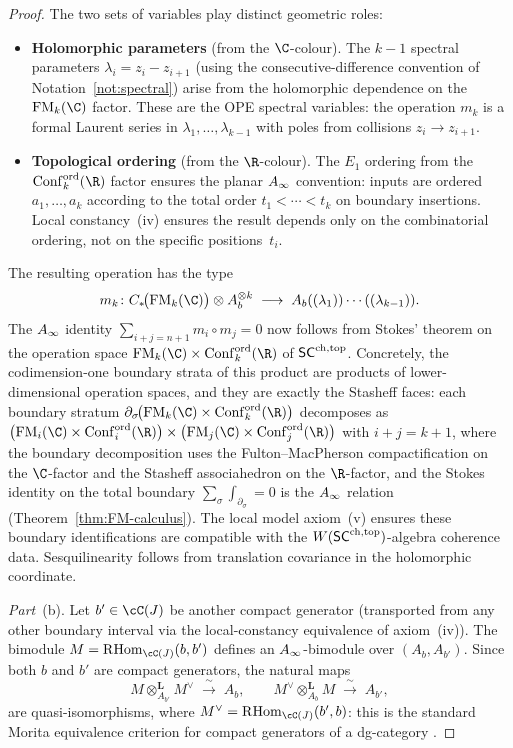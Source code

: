 \begin{proof}
The two sets of variables play distinct geometric roles:
\begin{itemize}
\item \textbf{Holomorphic parameters} (from the $\C$-colour). The
 $k-1$ spectral
 parameters $\lambda_i = z_i - z_{i+1}$ (using the consecutive-difference convention of Notation~\ref{not:spectral}) arise from the
 holomorphic dependence on the $\FM_k(\C)$ factor. These are the
 OPE spectral variables: the operation $m_k$ is a formal Laurent
 series in $\lambda_1,\ldots,\lambda_{k-1}$ with poles from
 collisions $z_i \to z_{i+1}$.
\item \textbf{Topological ordering} (from the $\R$-colour). The
 $E_1$ ordering from the
 $\Conf^{\mathrm{ord}}_k(\R)$ factor ensures the planar
 $A_\infty$ convention: inputs are ordered $a_1,\ldots,a_k$
 according to the total order $t_1 < \cdots < t_k$ on boundary
 insertions. Local constancy~(iv) ensures the result depends
 only on the combinatorial ordering, not on the specific
 positions~$t_i$.
\end{itemize}
The resulting operation has the type
\[
 m_k \colon
 C_\ast\!\bigl(\FM_k(\C)\bigr) \otimes A_b^{\otimes k}
 \;\longrightarrow\; A_b((\lambda_1))\cdots((\lambda_{k-1})).
\]
The $A_\infty$ identity $\sum_{i+j=n+1} m_i \circ m_j = 0$ now
follows from Stokes' theorem on the operation space
$\FM_k(\C) \times \Conf^{\mathrm{ord}}_k(\R)$ of $\mathsf{SC}^{\mathrm{ch},\mathrm{top}}$.
Concretely, the codimension-one boundary strata of this product
are products of lower-dimensional operation spaces, and they are
exactly the Stasheff faces: each boundary stratum
$\partial_\sigma\!\bigl(\FM_k(\C) \times
\Conf^{\mathrm{ord}}_k(\R)\bigr)$ decomposes as
$\bigl(\FM_i(\C) \times \Conf^{\mathrm{ord}}_i(\R)\bigr)
\times
\bigl(\FM_j(\C) \times \Conf^{\mathrm{ord}}_j(\R)\bigr)$
with $i + j = k + 1$, where the boundary decomposition uses the Fulton--MacPherson compactification on the $\C$-factor and the Stasheff associahedron on the $\R$-factor, and the Stokes identity on the total
boundary $\sum_\sigma \int_{\partial_\sigma} = 0$ is the $A_\infty$
relation (Theorem~\ref{thm:FM-calculus}). The local model
axiom~(v) ensures these boundary identifications are compatible
with the $W(\mathsf{SC}^{\mathrm{ch},\mathrm{top}})$-algebra coherence data.
Sesquilinearity follows from translation covariance in the
holomorphic coordinate.

\smallskip

\textit{Part}~(b).
Let $b' \in \cC(J)$ be another compact generator (transported from any other boundary interval via the local-constancy equivalence of axiom~(iv)). The bimodule
$M = \RHom_{\cC(J)}(b, b')$ defines an $A_\infty$-bimodule over $(A_b,
A_{b'})$. Since both $b$ and $b'$ are compact generators, the
natural maps
\[
 M \otimes^{\mathbf{L}}_{A_{b'}} M^\vee \;\xrightarrow{\;\sim\;}\; A_b,
 \qquad
 M^\vee \otimes^{\mathbf{L}}_{A_b} M \;\xrightarrow{\;\sim\;}\; A_{b'},
\]
are quasi-isomorphisms, where $M^\vee = \RHom_{\cC(J)}(b', b)$: this is
the standard Morita equivalence criterion for compact generators of
a dg-category \cite{Kel06,HA}.
\end{proof}

